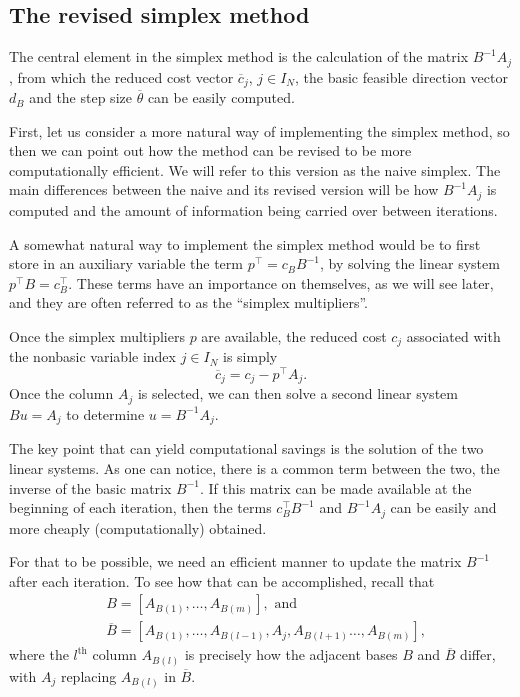 \subsection{The revised simplex method}

 
The central element in the simplex method is the calculation of the matrix $B^{-1}A_j$, from which the reduced cost vector $\overline{c}_j$, $j \in I_N$, the basic feasible direction vector $d_B$ and the step size $\overline{\theta}$ can be easily computed.

First, let us consider a more natural way of implementing the simplex method, so then we can point out how the method can be revised to be more computationally efficient. We will refer to this version as the naive simplex. The main differences between the naive and its revised version will be how $B^{-1}A_j$ is computed and the amount of information being carried over between iterations.

A somewhat natural way to implement the simplex method would be to first store in an auxiliary variable the term $p^\top = c_BB^{-1}$, by solving the linear system $p^\top B = c_B^\top$. These terms have an importance on themselves, as we will see later, and they are often referred to as the ``simplex multipliers''.

Once the simplex multipliers $p$ are available, the reduced cost $c_j$ associated with the nonbasic variable index $j \in I_N$ is simply 
%
\begin{equation*}
	\overline{c}_j = c_j - p^\top A_j.	
\end{equation*}
%
Once the column $A_j$ is selected, we can then solve a second linear system $Bu = A_j$ to determine $u = B^{-1}A_j$. 

The key point that can yield computational savings is the solution of the two linear systems. As one can notice, there is a common term between the two, the inverse of the basic matrix $B^{-1}$. If this matrix can be made available at the beginning of each iteration, then the terms $c_B^\top B^{-1}$ and $B^{-1}A_j$ can be easily and more cheaply (computationally) obtained.

For that to be possible, we need an efficient manner to update the matrix $B^{-1}$ after each iteration. To see how that can be accomplished, recall that
%
\begin{align*}
	& B = [A_{B(1)}, \dots, A_{B(m)}], \text{ and } \\ 
	& \overline{B} = [A_{B(1)}, \dots, A_{B(l-1)},A_j,A_{B(l+1)}\dots, A_{B(m)}], 
\end{align*}
%
where the $l^{\text{th}}$ column $A_{B(l)}$ is precisely how the adjacent bases $B$ and $\overline{B}$ differ, with $A_j$ replacing $A_{B(l)}$ in $\overline{B}$.

